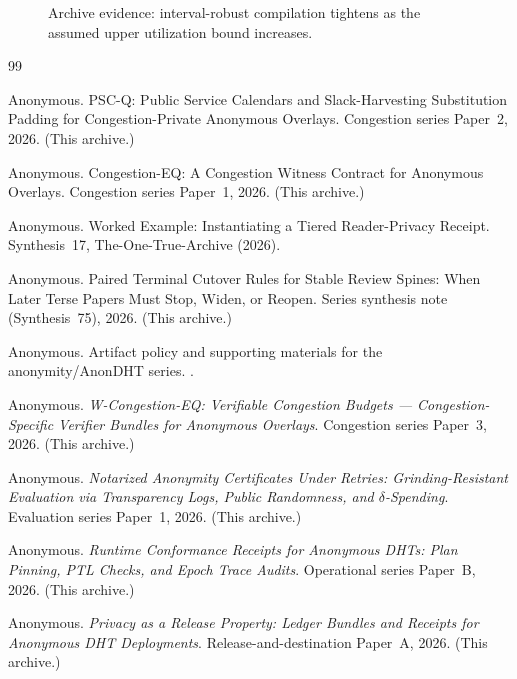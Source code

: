 \documentclass[11pt]{article}
\theoremstyle{definition}
\theoremstyle{remark}
\begin{document}
\begin{figure}[t]
\centering
{}
\caption{Archive evidence: interval-robust compilation tightens as the assumed upper utilization bound increases.}
\label{fig:utilrangeopt}
\end{figure}

\begin{thebibliography}{99}

Anonymous.
\newblock PSC-Q: Public Service Calendars and Slack-Harvesting Substitution Padding for Congestion-Private Anonymous Overlays.
\newblock Congestion series Paper~2, 2026. (This archive.)

Anonymous.
\newblock Congestion-EQ: A Congestion Witness Contract for Anonymous Overlays.
\newblock Congestion series Paper~1, 2026. (This archive.)

Anonymous.
\newblock Worked Example: Instantiating a Tiered Reader-Privacy Receipt.
\newblock Synthesis~17, The-One-True-Archive (2026).

Anonymous.
\newblock Paired Terminal Cutover Rules for Stable Review Spines: When Later Terse Papers Must Stop, Widen, or Reopen.
\newblock Series synthesis note (Synthesis~75), 2026. (This archive.)

Anonymous.
\newblock Artifact policy and supporting materials for the anonymity/AnonDHT series.
.

Anonymous.
\newblock \emph{W-Congestion-EQ: Verifiable Congestion Budgets --- Congestion-Specific Verifier Bundles for Anonymous Overlays}.
\newblock Congestion series Paper~3, 2026. (This archive.)

Anonymous.
\newblock \emph{Notarized Anonymity Certificates Under Retries: Grinding-Resistant Evaluation via Transparency Logs, Public Randomness, and $\delta$-Spending}.
\newblock Evaluation series Paper~1, 2026. (This archive.)

Anonymous.
\newblock \emph{Runtime Conformance Receipts for Anonymous DHTs: Plan Pinning, PTL Checks, and Epoch Trace Audits}.
\newblock Operational series Paper~B, 2026. (This archive.)

Anonymous.
\newblock \emph{Privacy as a Release Property: Ledger Bundles and Receipts for Anonymous DHT Deployments}.
\newblock Release-and-destination Paper~A, 2026. (This archive.)
\end{thebibliography}
\end{document}
